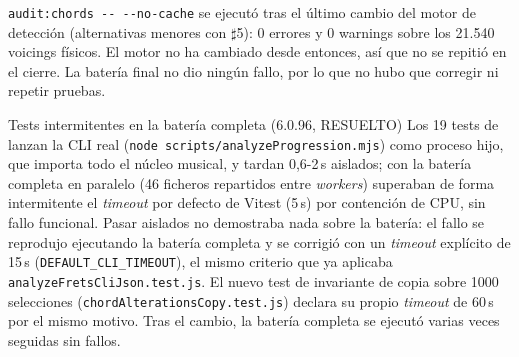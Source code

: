 \documentclass[a4paper,11pt,oneside]{report}
\newcommand{\shp}{\ensuremath{\sharp}}
\begin{document}
\lstinline!audit:chords -- --no-cache! se ejecutó tras el último cambio del motor de detección (alternativas menores con \shp5): 0 errores y 0 warnings sobre los 21.540 voicings físicos. El motor no ha cambiado desde entonces, así que no se repitió en el cierre. La batería final no dio ningún fallo, por lo que no hubo que corregir ni repetir pruebas.

\begin{hallazgobox}{Tests intermitentes en la batería completa (6.0.96, RESUELTO)}
Los 19 tests de \texttt{} lanzan la CLI real (\lstinline!node scripts/analyzeProgression.mjs!) como proceso hijo, que importa todo el núcleo musical, y tardan 0,6-2\,s aislados; con la batería completa en paralelo (46 ficheros repartidos entre \textit{workers}) superaban de forma intermitente el \textit{timeout} por defecto de Vitest (5\,s) por contención de CPU, sin fallo funcional. Pasar aislados no demostraba nada sobre la batería: el fallo se reprodujo ejecutando la batería completa y se corrigió con un \textit{timeout} explícito de 15\,s (\lstinline!DEFAULT_CLI_TIMEOUT!), el mismo criterio que ya aplicaba \lstinline!analyzeFretsCliJson.test.js!. El nuevo test de invariante de copia sobre 1000 selecciones (\lstinline!chordAlterationsCopy.test.js!) declara su propio \textit{timeout} de 60\,s por el mismo motivo. Tras el cambio, la batería completa se ejecutó varias veces seguidas sin fallos.


\end{hallazgobox}
\end{document}
